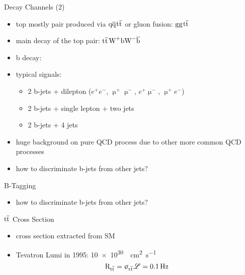 \begin{frame}{Decay Channels (2)}

	\begin{itemize}\itemfill
		\item top mostly pair produced via $\text{q}\overline{\text{q}}$\ch{->}$\text{t}\overline{\text{t}}$ or gluon fusion: $\text{g}\text{g}$\ch{->}$\text{t}\overline{\text{t}}$  
		\item main decay of the top pair: $\text{t}\overline{\text{t}}$\ch{->}$\text{W}^+\text{b}\text{W}^-\overline{\text{b}}$
		\item b decay:
	\end{itemize}
	
	\begin{figure}\vspace*{-10pt}
		\centering
		\hspace*{10pt}
	\end{figure}
	
	\begin{itemize}\itemfill
		\item typical signals:
		\begin{itemize}
			\item 2 b-jets + dilepton ($e^+e^-$, $\upmu^+\upmu^-$, $e^+\upmu^-$, $\upmu^+e^-$)
			\item 2 b-jets + single lepton + two jets
			\item 2 b-jets + 4 jets
		\end{itemize}
		\item huge background on pure QCD process due to other more common QCD processes
		\item how to discriminate b-jets from other jets?
	\end{itemize}

\end{frame}
\begin{frame}{B-Tagging}

	\begin{itemize}\itemfill
		\item how to discriminate b-jets from other jets?
	\end{itemize}

\end{frame}
\begin{frame}{$\text{t}\overline{\text{t}}$ Cross Section}

	\vspace*{-10pt}\vspace*{-10pt}
	
	\begin{itemize}\itemfill
		\item cross section extracted from SM
		\item Tevatron Lumi in 1995: \SI{10e30}{\per\centi\meter\squared\per\second}
		\begin{equation*} \text{R}_{\text{t}\overline{\text{t}}} = \upsigma_{\text{t}\overline{\text{t}}}\mathscr{L} = \SI{.1}{\hertz}\end{equation*}

	\end{itemize}

\end{frame}
